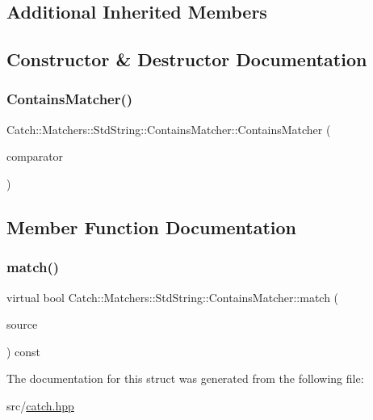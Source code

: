 \subsection*{Additional Inherited Members}


\subsection{Constructor \& Destructor Documentation}
\mbox{\label{struct_catch_1_1_matchers_1_1_std_string_1_1_contains_matcher_acc892883c8409e34b28c9b39d4ef1fe3}} 
\subsubsection{\texorpdfstring{Contains\+Matcher()}{ContainsMatcher()}}
{\footnotesize\ttfamily Catch\+::\+Matchers\+::\+Std\+String\+::\+Contains\+Matcher\+::\+Contains\+Matcher (\begin{DoxyParamCaption}\item[{\hyperlink{struct_catch_1_1_matchers_1_1_std_string_1_1_cased_string}{Cased\+String} const \&}]{comparator }\end{DoxyParamCaption})}



\subsection{Member Function Documentation}
\mbox{\label{struct_catch_1_1_matchers_1_1_std_string_1_1_contains_matcher_ae4d567347fa563e365f1044f29ab1042}} 
\subsubsection{\texorpdfstring{match()}{match()}}
{\footnotesize\ttfamily virtual bool Catch\+::\+Matchers\+::\+Std\+String\+::\+Contains\+Matcher\+::match (\begin{DoxyParamCaption}\item[{\textbf{ std\+::string} const \&}]{source }\end{DoxyParamCaption}) const\hspace{0.3cm}{\ttfamily [virtual]}}



The documentation for this struct was generated from the following file\+:\begin{DoxyCompactItemize}
\item 
src/\hyperlink{catch_8hpp}{catch.\+hpp}\end{DoxyCompactItemize}

